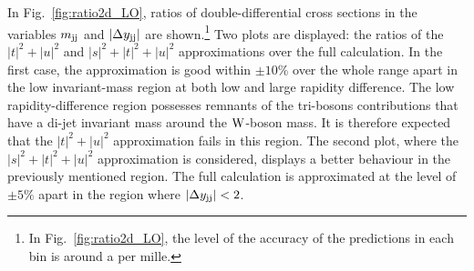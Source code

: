In Fig.~\ref{fig:ratio2d_LO}, ratios of double-differential cross sections in the variables  $m_{\text{j}\text{j}}$ and $|\Delta y_{\text{j}\text{j}}|$ are shown.\footnote{In Fig.~\ref{fig:ratio2d_LO}, the level of the accuracy of the predictions in each bin is around a per mille.}
Two plots are displayed: the ratios of the $|t|^2 + |u|^2$ and $|s|^2 + |t|^2 + |u|^2$ approximations over the full calculation.
In the first case, the approximation is good within $\pm10\%$ over the whole range apart in the low invariant-mass region at both low and large rapidity difference.
The low rapidity-difference region possesses remnants of the tri-bosons contributions that have a di-jet invariant mass around the $\text{W}$-boson mass.
It is therefore expected that the $|t|^2 + |u|^2$ approximation fails in this region.
The second plot, where the $|s|^2 + |t|^2 + |u|^2$ approximation is considered, displays a better behaviour in the previously mentioned region.
The full calculation is approximated at the level of $\pm5\%$ apart in the region where $|\Delta y_{\text{j}\text{j}}| < 2$.

